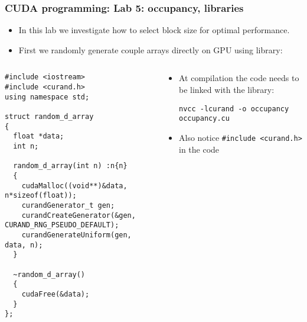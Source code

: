 \begin{frame}[fragile]
  \frametitle{CUDA programming: Lab 5: occupancy, libraries}
\begin{itemize}
\item In this lab we investigate how to select block size for optimal performance.
\item First we randomly generate couple arrays directly on GPU using  library:
\end{itemize}
\begin{columns}
\begin{column}{0.55\textwidth}
{\tiny
{\color{mycolorcode}
\begin{verbatim}
#include <iostream>
#include <curand.h>
using namespace std;

struct random_d_array
{
  float *data;
  int n;

  random_d_array(int n) :n{n}
  {
    cudaMalloc((void**)&data, n*sizeof(float));
    curandGenerator_t gen;
    curandCreateGenerator(&gen, CURAND_RNG_PSEUDO_DEFAULT);
    curandGenerateUniform(gen, data, n);
  }
  
  ~random_d_array()
  {
    cudaFree(&data);
  }
};

\end{verbatim}
}
}
\end{column}
\begin{column}{0.45\textwidth}

\begin{itemize}
\item At compilation the code needs to be linked with the library:
{\tiny
{\color{mycolorcli}
\begin{verbatim}
nvcc -lcurand -o occupancy occupancy.cu
\end{verbatim}
}
}
\item Also notice {\color{mycolorcode}\verb|#include <curand.h>|} in the code
\end{itemize}

\end{column}
\end{columns}
\end{frame}


